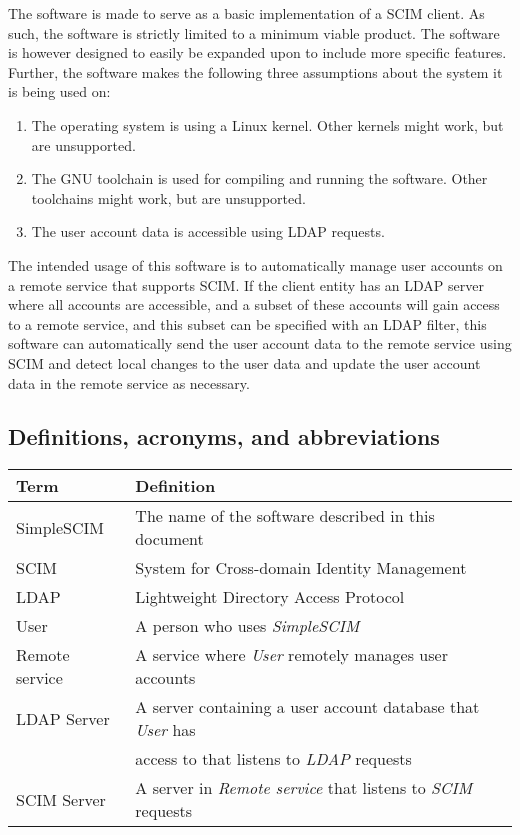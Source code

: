 \documentclass[12pt,twoside,a4paper,titlepage]{article}
\begin{document}
  \noindent
  The software is made to serve as a basic implementation of a SCIM
  client. As such, the software is strictly limited to a minimum
  viable product. The software is however designed to easily be
  expanded upon to include more specific features. Further, the
  software makes the following three assumptions about the system it
  is being used on:

  \begin{enumerate}
   \item
    The operating system is using a Linux kernel. Other kernels might
    work, but are unsupported.

   \item
    The GNU toolchain is used for compiling and running the software.
    Other toolchains might work, but are unsupported.

   \item
    The user account data is accessible using LDAP requests.
  \end{enumerate}

  \noindent
  The intended usage of this software is to automatically manage user
  accounts on a remote service that supports SCIM. If the client
  entity has an LDAP server where all accounts are accessible, and
  a subset of these accounts will gain access to a remote service,
  and this subset can be specified with an LDAP filter, this software
  can automatically send the user account data to the remote service
  using SCIM and detect local changes to the user data and update the
  user account data in the remote service as necessary.

  \newpage

  \subsection{Definitions, acronyms, and abbreviations}

  \begin{tabular}{|l|l|}
   \hline
   \textbf{Term} & \textbf{Definition} \\
   \hline
   SimpleSCIM     & The name of the software described in this
                    document \\
   SCIM           & System for Cross-domain Identity
                    Management~\cite{rfc7642, rfc7643, rfc7644} \\
   LDAP           & Lightweight Directory Access
                    Protocol~\cite{rfc4511} \\
   User           & A person who uses \textit{SimpleSCIM} \\
   Remote service & A service where \textit{User} remotely manages
                    user accounts \\
   LDAP Server    & A server containing a user account database that
                    \textit{User} has \\
                  & access to that listens to \textit{LDAP}
                    requests \\
   SCIM Server    & A server in \textit{Remote service} that listens
                    to \textit{SCIM} requests \\
   \hline
  \end{tabular}
\end{document}
